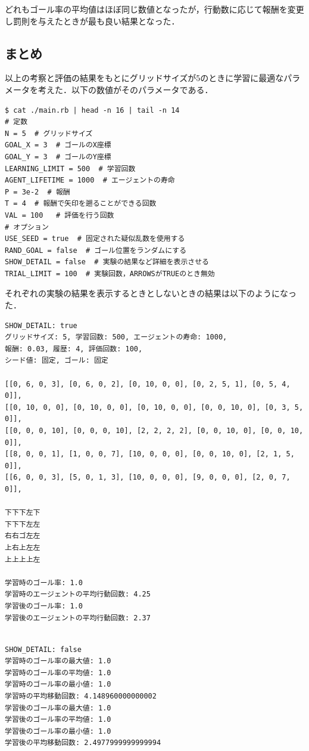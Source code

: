 \documentclass[a4j,11pt]{jarticle}
\begin{document}
どれもゴール率の平均値はほぼ同じ数値となったが，行動数に応じて報酬を変更し罰則を与えたときが最も良い結果となった．

\subsection{まとめ}

以上の考察と評価の結果をもとにグリッドサイズが5のときに学習に最適なパラメータを考えた．以下の数値がそのパラメータである．

\begin{verbatim}
$ cat ./main.rb | head -n 16 | tail -n 14
# 定数
N = 5  # グリッドサイズ
GOAL_X = 3  # ゴールのX座標
GOAL_Y = 3  # ゴールのY座標
LEARNING_LIMIT = 500  # 学習回数
AGENT_LIFETIME = 1000  # エージェントの寿命
P = 3e-2  # 報酬
T = 4  # 報酬で矢印を遡ることができる回数
VAL = 100   # 評価を行う回数
# オプション
USE_SEED = true  # 固定された疑似乱数を使用する
RAND_GOAL = false  # ゴール位置をランダムにする
SHOW_DETAIL = false  # 実験の結果など詳細を表示させる
TRIAL_LIMIT = 100  # 実験回数，ARROWSがTRUEのとき無効
\end{verbatim}

それぞれの実験の結果を表示するときとしないときの結果は以下のようになった．

\newpage

\begin{verbatim}
SHOW_DETAIL: true
グリッドサイズ: 5, 学習回数: 500, エージェントの寿命: 1000,
報酬: 0.03, 履歴: 4, 評価回数: 100,
シード値: 固定, ゴール: 固定

[[0, 6, 0, 3], [0, 6, 0, 2], [0, 10, 0, 0], [0, 2, 5, 1], [0, 5, 4, 0]],
[[0, 10, 0, 0], [0, 10, 0, 0], [0, 10, 0, 0], [0, 0, 10, 0], [0, 3, 5, 0]],
[[0, 0, 0, 10], [0, 0, 0, 10], [2, 2, 2, 2], [0, 0, 10, 0], [0, 0, 10, 0]],
[[8, 0, 0, 1], [1, 0, 0, 7], [10, 0, 0, 0], [0, 0, 10, 0], [2, 1, 5, 0]],
[[6, 0, 0, 3], [5, 0, 1, 3], [10, 0, 0, 0], [9, 0, 0, 0], [2, 0, 7, 0]],

下下下左下
下下下左左
右右ゴ左左
上右上左左
上上上上左

学習時のゴール率: 1.0
学習時のエージェントの平均行動回数: 4.25
学習後のゴール率: 1.0
学習後のエージェントの平均行動回数: 2.37
\end{verbatim}

\begin{verbatim}

SHOW_DETAIL: false
学習時のゴール率の最大値: 1.0
学習時のゴール率の平均値: 1.0
学習時のゴール率の最小値: 1.0
学習時の平均移動回数: 4.148960000000002
学習後のゴール率の最大値: 1.0
学習後のゴール率の平均値: 1.0
学習後のゴール率の最小値: 1.0
学習後の平均移動回数: 2.4977999999999994
\end{verbatim}
\end{document}

